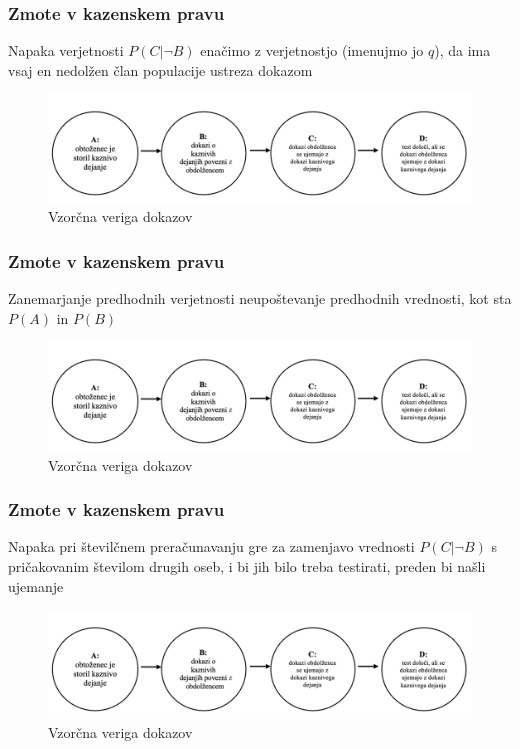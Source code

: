 \documentclass{beamer}
\begin{document}
\begin{frame}
    \frametitle{Zmote v kazenskem pravu}
    \begin{block}{Napaka verjetnosti}
        $P(C \lvert \neg B)$ enačimo z verjetnostjo (imenujmo jo $q$), da ima vsaj en nedolžen član populacije ustreza dokazom
    \end{block}
    \begin{figure}[!ht]\label{fig:slika_3}
        \centering
        \includegraphics[scale=0.50]{slika_3.png}
        \caption{Vzorčna veriga dokazov}
    \end{figure}
\end{frame}

\begin{frame}
    \frametitle{Zmote v kazenskem pravu}
    \begin{block}{Zanemarjanje predhodnih verjetnosti}
        neupoštevanje predhodnih vrednosti, kot sta $P(A)$ in $P(B)$
    \end{block}
    \begin{figure}[!ht]\label{fig:slika_3}
        \centering
        \includegraphics[scale=0.50]{slika_3.png}
        \caption{Vzorčna veriga dokazov}
    \end{figure}
\end{frame}

\begin{frame}
    \frametitle{Zmote v kazenskem pravu}
    \begin{block}{Napaka pri številčnem preračunavanju}
        gre za zamenjavo vrednosti $P(C \lvert \neg B)$ s pričakovanim številom drugih oseb, i bi jih bilo treba testirati, preden bi našli ujemanje
    \end{block}
    \begin{figure}[!ht]\label{fig:slika_3}
        \centering
        \includegraphics[scale=0.50]{slika_3.png}
        \caption{Vzorčna veriga dokazov}
    \end{figure}
\end{frame}
\end{document}
